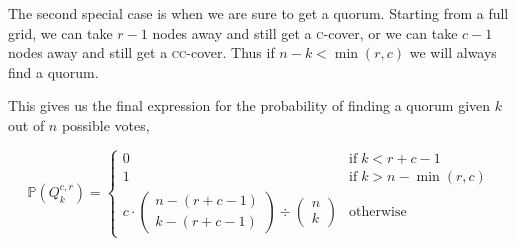 \documentclass[10pt]{scrartcl}
\begin{document}
The second special case is when we are sure to get a quorum. Starting from a full grid, we can take \(r-1\) nodes away and still get a  \textsc{c}-cover, or we can take \(c-1\) nodes away and still get a \textsc{cc}-cover. Thus if \(n-k < \min(r,c)\) we will always find a quorum.

This gives us the final expression for the probability of finding a quorum given \(k\) out of \(n\) possible votes,

\[
\mathbb{P}(Q^{c,r}_k) =
    \begin{cases}
        0 & \text{if}\;k < r+c-1 \\
        1 & \text{if}\;k > n - \min(r,c) \\
        {c \cdot \begin{pmatrix}n-(r+c-1) \\ k-(r+c-1)\end{pmatrix}} \div {\begin{pmatrix}n \\ k\end{pmatrix}} & \text{otherwise}
    \end{cases}
\]



\end{document}
